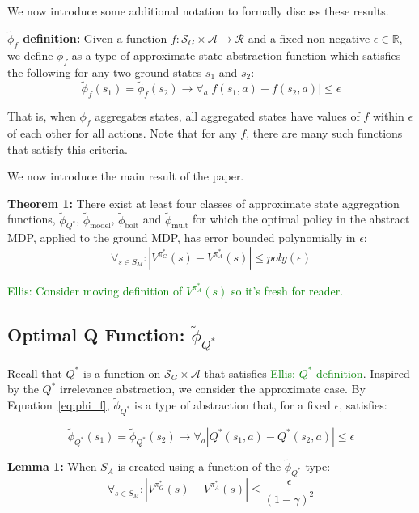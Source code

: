 \documentclass{article}
\newcommand{\ep}{\widetilde \phi}
\newcommand\enote[1]{\textcolor{green}{Ellis: #1}}
\begin{document}
We now introduce some additional notation to formally discuss these results.

{\bf $\ep_f$ definition:} Given a function $f : \mathcal{S}_G \times \mathcal{A} \rightarrow \mathcal{R}$ and a fixed non-negative $\epsilon \in \mathbb{R}$, we define $\ep_f$ as a type of approximate state abstraction function which satisfies the following for any two ground states $s_1$ and $s_2$: 
\begin{equation}
\label{eq:phi_f}
\ep_f(s_1) = \ep_f(s_2) \rightarrow \forall_a \left|f(s_1, a) - f(s_2, a)\right| \leq \epsilon
\end{equation}

That is, when $\phi_f$ aggregates states, all aggregated states have values of $f$ within $\epsilon$ of each other for all actions. Note that for any $f$, there are many such functions that satisfy this criteria.

We now introduce the main result of the paper.

{\bf Theorem 1:} There exist at least four classes of approximate state aggregation functions, $\ep_{Q^*}$, $\ep_{\text{model}}$, $\ep_{\text{bolt}}$ and $\ep_{\text{mult}}$ for which the optimal policy in the abstract MDP, applied to the ground MDP, has error bounded polynomially in $\epsilon$:
\begin{equation}
\forall_{s \in S_M} : | V^{\pi^*_G}(s) - V^{\pi^*_{A}}(s) | \leq poly(\epsilon)
\end{equation}

\enote{Consider moving definition of $V^{\pi^*_{A}}(s)$ so it's fresh for reader.}

\subsection{Optimal Q Function: $\ep_{Q^*}$}

Recall that $Q^*$ is a function on $\mathcal{S}_G \times \mathcal{A}$ that satisfies \enote{$Q^*$ definition}. Inspired by the $Q^*$ irrelevance abstraction, we consider the approximate case. By Equation~\ref{eq:phi_f}, $\ep_{Q^*}$ is a type of abstraction that, for a fixed $\epsilon$, satisfies:

\begin{equation}
\ep_{Q^*}(s_1) = \ep_{Q^*}(s_2) \rightarrow \forall_a \left|Q^*(s_1, a) - Q^*(s_2, a)\right| \leq \epsilon
\end{equation}

{\bf Lemma 1:} When $S_A$ is created using a function of the $\ep_{Q^*}$ type:
\begin{equation}
\forall_{s \in S_M} : | V^{\pi^*_G}(s) - V^{\pi^*_{A}}(s) | \leq \frac{\epsilon}{(1-\gamma)^2}
\end{equation}
\end{document}
